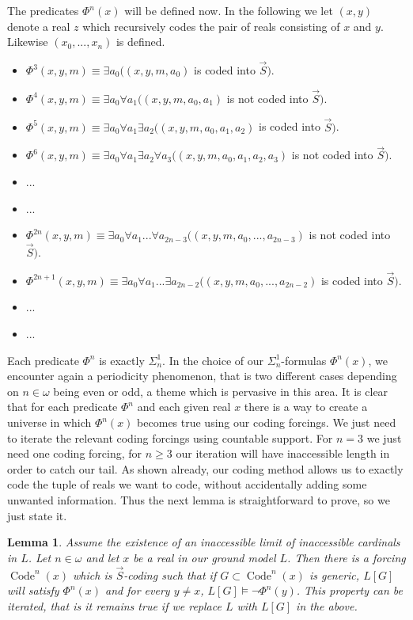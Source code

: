 \documentclass[a4paper,11pt]{article}
\newtheorem{lemma}[theorem]{Lemma}
\begin{document}
The predicates $\Phi^n(x)$ will be defined now. In the following we let
$(x,y)$ denote a real $z$ which recursively codes the pair of reals consisting  of $x$ and $y$. Likewise $(x_0,...,x_n)$ is defined.

\begin{itemize}
\item $\Phi^3 (x,y,m) \equiv \exists a_0 ( (x,y,m,a_0)$ is coded into $\vec{S})$.
\item $\Phi^4(x,y,m) \equiv \exists a_0 \forall a_1 ( (x,y,m,a_0,a_1)$ is not coded into $\vec{S} )$.
\item $\Phi^5(x,y,m) \equiv \exists a_0 \forall a_1 \exists a_2 ( (x,y,m,a_0, a_1,a_2)$ is coded into $\vec{S} )$.
\item $\Phi^6 (x,y,m) \equiv \exists a_0 \forall a_1 \exists a_2 \forall a_3 ( (x,y,m,a_0,a_1, a_2,a_3)$ is not coded into $\vec{S})$.
\item ...
\item ...
\item $\Phi^{2n} (x,y,m) \equiv \exists a_0 \forall a_1...\forall a_{2n-3} (( x,y,m,a_0,...,a_{2n-3} )$ is not coded into $\vec{S} )$.
\item $\Phi^{2n+1} (x,y,m) \equiv \exists a_0 \forall a_{1}...\exists a_{2n-2} (( x,y,m,a_0,...,a_{2n-2})$ is coded into $\vec{S} )$.
\item ...
\item...

\end{itemize}
Each predicate $\Phi^n$ is exactly $\Sigma^1_n$.
In the choice of our $\Sigma^1_n$-formulas $\Phi^n(x)$, we encounter again a periodicity phenomenon, that is two different cases depending on $n\in \omega$ being even or odd, a theme which is pervasive in this area.
It is clear that for each predicate $\Phi^n$ and each given real $x$ there is a way to create a universe in which $\Phi^n (x)$ becomes true using our coding forcings. We just need to iterate the relevant coding forcings using countable support. For $n=3$ we just need one coding forcing, for $n \ge3$ our iteration will have inaccessible length in order to catch our tail. As shown already, our coding method allows us to exactly code the tuple of reals we want to code, without accidentally adding some unwanted information. Thus the next lemma is straightforward to prove, so we just state it.
\begin{lemma}
Assume the existence of an inaccessible limit of inaccessible cardinals in $L$. Let $n \in \omega$ and let $x$ be a real in our ground model $L$. Then there is a forcing $\operatorname{Code}^n (x)$ which is $\vec S$-coding such that if $G \subset \operatorname{Code}^n (x)$ is generic,
$L[G]$ will satisfy $\Phi^n(x)$ and for every $y \ne x$, $L[G] \models \lnot \Phi^n(y)$.
This property can be iterated, that is it remains true if we replace $L$ with $L[G]$ in the above.

\end{lemma}
\end{document}
